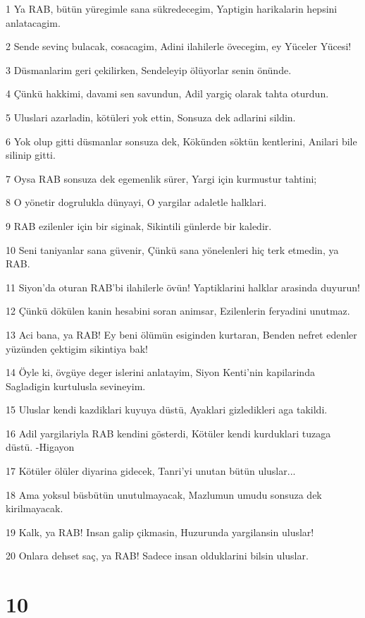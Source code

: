 \par 1 Ya RAB, bütün yüregimle sana sükredecegim, Yaptigin harikalarin hepsini anlatacagim.
\par 2 Sende sevinç bulacak, cosacagim, Adini ilahilerle övecegim, ey Yüceler Yücesi!
\par 3 Düsmanlarim geri çekilirken, Sendeleyip ölüyorlar senin önünde.
\par 4 Çünkü hakkimi, davami sen savundun, Adil yargiç olarak tahta oturdun.
\par 5 Uluslari azarladin, kötüleri yok ettin, Sonsuza dek adlarini sildin.
\par 6 Yok olup gitti düsmanlar sonsuza dek, Kökünden söktün kentlerini, Anilari bile silinip gitti.
\par 7 Oysa RAB sonsuza dek egemenlik sürer, Yargi için kurmustur tahtini;
\par 8 O yönetir dogrulukla dünyayi, O yargilar adaletle halklari.
\par 9 RAB ezilenler için bir siginak, Sikintili günlerde bir kaledir.
\par 10 Seni taniyanlar sana güvenir, Çünkü sana yönelenleri hiç terk etmedin, ya RAB.
\par 11 Siyon'da oturan RAB'bi ilahilerle övün! Yaptiklarini halklar arasinda duyurun!
\par 12 Çünkü dökülen kanin hesabini soran animsar, Ezilenlerin feryadini unutmaz.
\par 13 Aci bana, ya RAB! Ey beni ölümün esiginden kurtaran, Benden nefret edenler yüzünden çektigim sikintiya bak!
\par 14 Öyle ki, övgüye deger islerini anlatayim, Siyon Kenti'nin kapilarinda Sagladigin kurtulusla sevineyim.
\par 15 Uluslar kendi kazdiklari kuyuya düstü, Ayaklari gizledikleri aga takildi.
\par 16 Adil yargilariyla RAB kendini gösterdi, Kötüler kendi kurduklari tuzaga düstü. -Higayon
\par 17 Kötüler ölüler diyarina gidecek, Tanri'yi unutan bütün uluslar...
\par 18 Ama yoksul büsbütün unutulmayacak, Mazlumun umudu sonsuza dek kirilmayacak.
\par 19 Kalk, ya RAB! Insan galip çikmasin, Huzurunda yargilansin uluslar!
\par 20 Onlara dehset saç, ya RAB! Sadece insan olduklarini bilsin uluslar.

\chapter{10}

